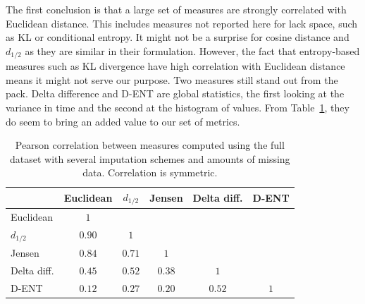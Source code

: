 \documentclass{article}
\begin{document}
The first conclusion is that a large set of measures are strongly
correlated with Euclidean distance. This includes measures not
reported here for lack space, such as KL or conditional entropy.
It might not be a surprise for
cosine distance and $d_{1/2}$ as they are similar in their
formulation. However, the fact that entropy-based measures such as KL
divergence have high correlation with Euclidean distance means it
might not serve our purpose. Two measures still stand out from the
pack.  Delta difference and D-ENT are global statistics, the first
looking at the variance in time and the second at the histogram of
values. From Table~\ref{tab:corrs}, they do seem to bring an added
value to our set of metrics.

\begin{table}[t]
    \begin{center}
      \begin{tabular}{@{}l c c c c c @{}}
        \toprule
                            & Euclidean       & $d_{1/2}$ & Jensen & Delta diff. & D-ENT \\ 
        \midrule
        Euclidean           & $1$             &  &  &  &  \\ 
        $d_{1/2}$             & $0.90$          & $1$    &  &  &  \\ 
        Jensen              & $0.84$          & $0.71$ & $1$    &  &  \\ 
        Delta diff. & $\mathbf{0.45}$ & $0.52$ & $0.38$ & $1$ &  \\ 
        D-ENT               & $\mathbf{0.12}$ & $0.27$ & $0.20$  & $0.52$ & $1$ \\
        \bottomrule
      \end{tabular}
      \caption{Pearson correlation between measures computed using the full dataset 
               with several imputation schemes and amounts of missing data.
               Correlation is symmetric.}
      \label{tab:corrs}
    \end{center}
\end{table}
\end{document}
